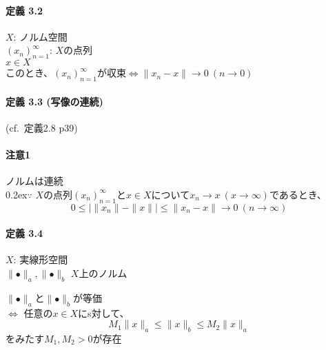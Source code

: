 \documentclass[12pt,a4paper]{article}
\begin{document}
    \paragraph{定義 3.2 \\}
      \noindent$X$: ノルム空間 \\
      ${(x_n)}_{n=1}^\infty$: $X$の点列 \\
      $x \in X$ \\
      このとき、${(x_n)}_{n=1}^\infty$が収束$\Leftrightarrow \parallel x_n - x \parallel \rightarrow 0 \ (n \rightarrow 0)$
    
    \paragraph{定義 3.3 (写像の連続)}
      (cf.\ 定義2.8 p39)
    \paragraph{注意1}
      ノルムは連続\\
      \raise0.2ex\hbox{\textcircled{\scriptsize{$\because$}}}
      $X$の点列${(x_n)}_{n=1}^\infty$と$x \in X$について$x_n \rightarrow x \ (x \rightarrow \infty)$であるとき、
      \[ 0 \leq \mid \parallel x_n \parallel - \parallel x \parallel \mid \leq \parallel x_n -  x\parallel \rightarrow 0 \ (n \rightarrow \infty) \]
    \paragraph{定義 3.4 \\}
      $X$: 実線形空間 \\
      $\parallel \bullet \parallel_a, \parallel \bullet \parallel_b$ $X$上のノルム 
    
      $\parallel \bullet \parallel_a$と$\parallel\bullet\parallel_b$が等価 \\
      $\Leftrightarrow$ 任意の$x \in X$にs対して、
      \[ M_1 \parallel x \parallel_a \leq \parallel x \parallel_b \leq M_2 \parallel x \parallel_a \]
      をみたす$M_1, M_2 > 0$が存在
\end{document}
